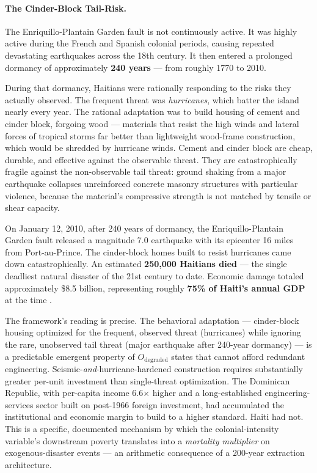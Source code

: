 \paragraph{The Cinder-Block Tail-Risk.}
\label{par:cinder_block_tail_risk}
The Enriquillo-Plantain Garden fault is not continuously active. It was highly active during the French and Spanish colonial periods, causing repeated devastating earthquakes across the 18th century. It then entered a prolonged dormancy of approximately \textbf{240 years} --- from roughly 1770 to 2010.

During that dormancy, Haitians were rationally responding to the risks they actually observed. The frequent threat was \textit{hurricanes}, which batter the island nearly every year. The rational adaptation was to build housing of cement and cinder block, forgoing wood --- materials that resist the high winds and lateral forces of tropical storms far better than lightweight wood-frame construction, which would be shredded by hurricane winds. Cement and cinder block are cheap, durable, and effective against the observable threat. They are catastrophically fragile against the non-observable tail threat: ground shaking from a major earthquake collapses unreinforced concrete masonry structures with particular violence, because the material's compressive strength is not matched by tensile or shear capacity.

On January 12, 2010, after 240 years of dormancy, the Enriquillo-Plantain Garden fault released a magnitude 7.0 earthquake with its epicenter 16 miles from Port-au-Prince. The cinder-block homes built to resist hurricanes came down catastrophically. An estimated \textbf{250,000 Haitians died} --- the single deadliest natural disaster of the 21st century to date. Economic damage totaled approximately \$8.5 billion, representing roughly \textbf{75\% of Haiti's annual GDP} at the time \cite{usgs_enriquillo_fault}.

The framework's reading is precise. The behavioral adaptation --- cinder-block housing optimized for the frequent, observed threat (hurricanes) while ignoring the rare, unobserved tail threat (major earthquake after 240-year dormancy) --- is a predictable emergent property of $O_{\text{degraded}}$ states that cannot afford redundant engineering. Seismic-\textit{and}-hurricane-hardened construction requires substantially greater per-unit investment than single-threat optimization. The Dominican Republic, with per-capita income 6.6× higher and a long-established engineering-services sector built on post-1966 foreign investment, had accumulated the institutional and economic margin to build to a higher standard. Haiti had not. This is a specific, documented mechanism by which the colonial-intensity variable's downstream poverty translates into a \textit{mortality multiplier} on exogenous-disaster events --- an arithmetic consequence of a 200-year extraction architecture.

